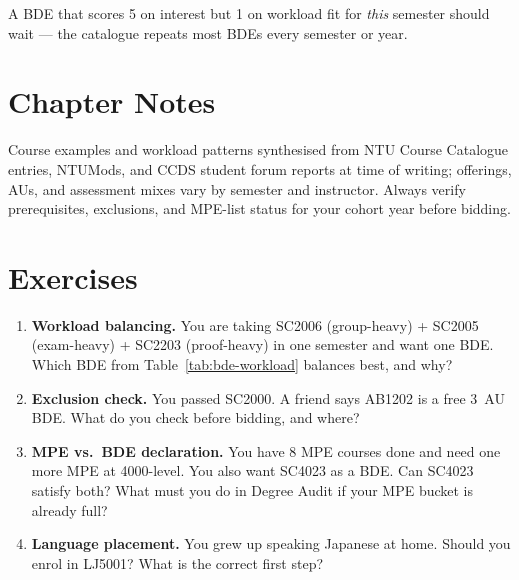 A BDE that scores 5 on interest but 1 on workload fit for \emph{this} semester should wait --- the catalogue repeats most BDEs every semester or year.

\section{Chapter Notes}
Course examples and workload patterns synthesised from NTU Course Catalogue entries, NTUMods, and CCDS student forum reports at time of writing; offerings, AUs, and assessment mixes vary by semester and instructor. Always verify prerequisites, exclusions, and MPE-list status for your cohort year before bidding.

\section{Exercises}
\label{sec:ch02-exercises}
\begin{enumerate}[label=E2.\arabic*, leftmargin=*, itemsep=0.8em]
    \item \textbf{Workload balancing.} You are taking SC2006 (group-heavy) + SC2005 (exam-heavy) + SC2203 (proof-heavy) in one semester and want one BDE. Which BDE from Table~\ref{tab:bde-workload} balances best, and why?
    \item \textbf{Exclusion check.} You passed SC2000. A friend says AB1202 is a free 3~AU BDE. What do you check before bidding, and where?
    \item \textbf{MPE vs.\ BDE declaration.} You have 8 MPE courses done and need one more MPE at 4000-level. You also want SC4023 as a BDE. Can SC4023 satisfy both? What must you do in Degree Audit if your MPE bucket is already full?
    \item \textbf{Language placement.} You grew up speaking Japanese at home. Should you enrol in LJ5001? What is the correct first step?
\end{enumerate}
